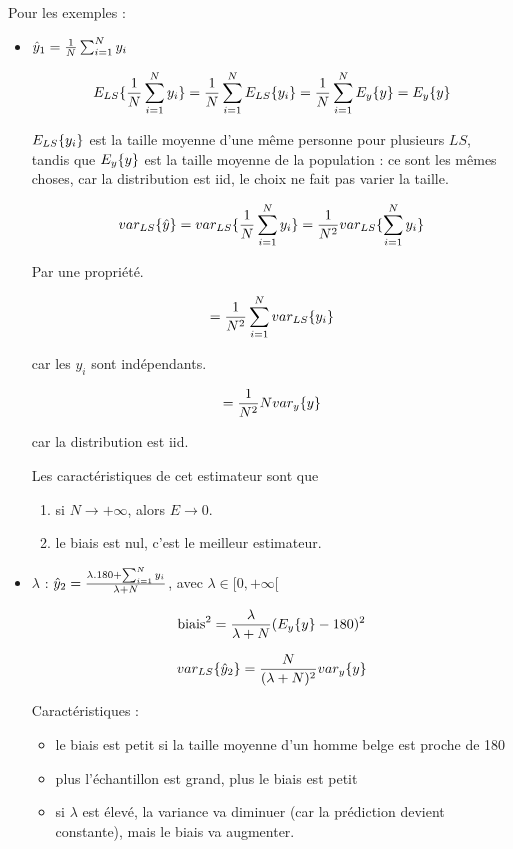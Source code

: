 	
	
	Pour les exemples :
	
	\begin{itemize}
		\item $\hat{y}_1 = \frac{1}{N} \sum_{i = 1}^N y_i$
		
		$$E_{LS}\{\frac{1}{N} \sum_{i = 1}^N y_i\} = \frac{1}{N} \sum_{i = 1}^N E_{LS}\{y_i\} = \frac{1}{N} \sum_{i = 1}^N E_y\{y\} = E_y\{y\}$$
		
		$E_{LS}\{y_i\}$ est la taille moyenne d'une même personne pour plusieurs $LS$, tandis que $E_y\{y\}$ est la taille moyenne de la population : ce sont les mêmes choses, car la distribution est iid, le choix ne fait pas varier la taille.
		
		$$var_{LS}\{\hat{y}\} = var_{LS}\{\frac{1}{N} \sum_{i = 1}^N y_i\} = \frac{1}{N^2} var_{LS}\{\sum_{i = 1}^N y_i\}$$
		
		Par une propriété.
		
		$$= \frac{1}{N^2} \sum_{i = 1}^N var_{LS}\{y_i\}$$
		
		car les $y_i$ sont indépendants.
		
		$$= \frac{1}{N^2} N var_y\{y\}$$
		
		car la distribution est iid.
		
		Les caractéristiques de cet estimateur sont que
		
		\begin{enumerate}
			\item si $N \rightarrow + \infty$, alors $E \rightarrow 0$.
			\item le biais est nul, c'est le meilleur estimateur.			
		\end{enumerate}
		
		\item $\lambda$ : $\hat{y}_2 = \frac{\lambda . 180 + \sum_{i = 1}^N y_i}{\lambda + N}$, avec $\lambda \in [ 0, +\infty [ $
		
		$$\text{biais}^2 = \frac{\lambda}{\lambda + N} (E_y\{y\} - 180)^2$$
		
		$$var_{LS}\{\hat{y}_2\} = \frac{N}{(\lambda + N)^2} var_y\{y\}$$
		
		Caractéristiques :
		
		\begin{itemize}
			\item le biais est petit si la taille moyenne d'un homme belge est proche de 180
			\item plus l'échantillon est grand, plus le biais est petit
			\item si $\lambda$ est élevé, la variance va diminuer (car la prédiction devient constante), mais le biais va augmenter.
		\end{itemize}
	\end{itemize}
	
